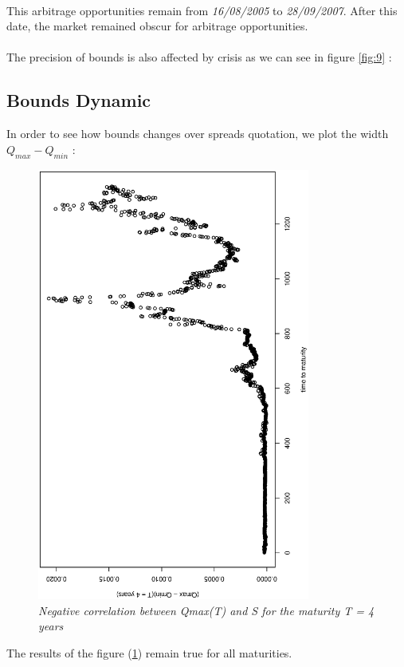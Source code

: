 \paragraph{}
This   arbitrage   opportunities   remain   from  {\it   16/08/2005}   to   {\it
  28/09/2007}. After this date, the market remained obscur for arbitrage opportunities.
\paragraph{}
The precision  of bounds  is also  affected by crisis  as we  can see  in figure
\ref{fig:9} :


\subsection{Bounds Dynamic}
\label{sec:bounds-effectiveness}

In order  to see how  bounds changes over spreads  quotation, we plot  the width
$Q_{max}-Q_{min}$ :
\begin{figure}[H]
  \centering
  \includegraphics[angle=-90,width=0.8\textwidth]{bounds_Dynamic_T_4}
  \caption{\it Negative correlation between Qmax(T) and S for the maturity T = 4 years}
  \label{fig:10}
\end{figure}

The results of the figure (\ref{fig:10}) remain true for all maturities.
